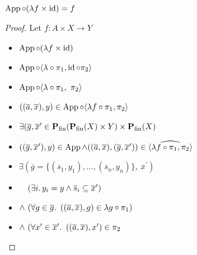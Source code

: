\begin{prop}
  $\operatorname{App}\circ(\lambda f\times\operatorname{id}) = f$
  \begin{proof}
    Let $f : A\times X\to Y$
    \begin{itemize}
      \item[\phs]
        $\operatorname{App}\circ(\lambda f\times\operatorname{id})$

      \item[\eqs]
        $\operatorname{App}\circ\langle\lambda\circ\pi_1,\operatorname{id}\circ\pi_2\rangle$
        \marginnote{\Def-$\times$}

      \item[\eqs]
        $\operatorname{App}\circ\langle\lambda\circ\pi_1,~\pi_2\rangle$
        \marginnote{\Def-$\id$}

      \item[\phantom{\imps}]
        $((\overline{a},\overline{x}), y)\in\operatorname{App}\circ\langle\lambda f\circ\pi_1,\pi_2\rangle$

      \item[\iffs]
        $\exists(\overline{g},\overline{x}^\prime\in\mathbf{P}_{\operatorname{fin}}(\mathbf{P}_{\operatorname{fin}}(X)\times Y)\times\mathbf{P}_{\operatorname{fin}}(X)$
        \marginnote{\Def-\ref{def:crel-comp}}

      \addtolength{\itemsep}{-.3\baselineskip}
      \item[\phantom{\imps}]
        \quad$((\overline{g},\overline{x}^\prime), y)\in\operatorname{App}\land((\overline{a},\overline{x}),(\overline{g},\overline{x}^\prime))\in\widehat{\langle\lambda f\circ\pi_1,\pi_2\rangle}$

      \addtolength{\itemsep}{.3\baselineskip}

      \item[\iffs]
        $\exists(\overline{g} = \{(\overline{s}_1,y_1),\ldots,(\overline{s}_n,y_n)\},~\overline{x}^\prime)$

      \addtolength{\itemsep}{-.3\baselineskip}
      \item[\phantom{\imps}]
        \quad$\phantom{\land}~(\exists i\ldotp y_i=y\land\overline{s}_i\subseteq\overline{x}^\prime)$
        \marginnote{\Def-$\App$}

      \item[\phantom{\imps}]
        \quad$\land~(\forall g\in\overline{g}\ldotp~((\overline{a},\overline{x}),g)\in\lambda g\circ\pi_1)$

      \item[\phantom{\imps}]
        \quad$\land~(\forall x^\prime\in\overline{x}^\prime\ldotp~((\overline{a},\overline{x}), x^\prime)\in\pi_2$
      \addtolength{\itemsep}{.3\baselineskip}


\end{itemize}
\end{proof}
\end{prop}
